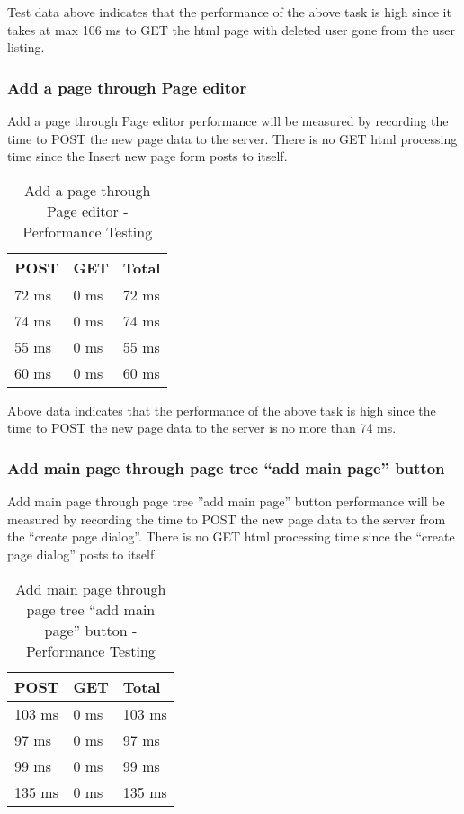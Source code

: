 \documentclass[12pt]{article}
\begin{document}
Test data above indicates that the performance of the above task is high since it takes at max 106 ms to GET the html page with 
deleted user gone from the user listing.

\subsubsection{Add a page through Page editor}
Add a page through Page editor performance will be measured by recording the time to POST the new page data to the server. There is no GET html processing time since the Insert new page form posts to itself.

\begin{table}[H]
\centering
\caption{Add a page through Page editor - Performance Testing}
\begin{tabular}{|l|l|l|}
\hline
POST  & GET  & Total \\ \hline
72 ms & 0 ms & 72 ms \\ \hline
74 ms & 0 ms & 74 ms \\ \hline
55 ms & 0 ms & 55 ms \\ \hline
60 ms & 0 ms & 60 ms \\ \hline
\end{tabular}
\end{table}

Above data indicates that the performance of the above task is high since the time to POST the new page data to the server is no more than 74 ms.

\subsubsection{Add main page through page tree “add main page” button}
Add main page through page tree ''add main page'' button performance will be measured by recording the time to POST the new page data to the server from the “create page dialog”. There is no GET html processing time since the “create page dialog” posts to itself.

\begin{table}[H]
\centering
\caption{Add main page through page tree “add main page” button - Performance Testing}
\begin{tabular}{|l|l|l|}
\hline
POST   & GET  & Total  \\ \hline
103 ms & 0 ms & 103 ms \\ \hline
97 ms  & 0 ms & 97 ms  \\ \hline
99 ms  & 0 ms & 99 ms  \\ \hline
135 ms & 0 ms & 135 ms \\ \hline
\end{tabular}
\end{table}
\end{document}
